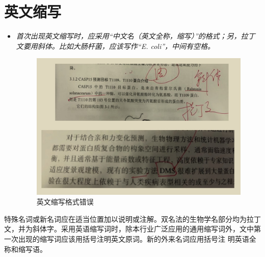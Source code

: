 \section{英文缩写}
\begin{itemize}
\item \emph{首次出现英文缩写时，应采用“中文名（英文全称，缩写）”的格式；另，拉丁文要用斜体。比如大肠杆菌，应该写作“\textit{E. coli}”，中间有空格。}
\begin{figure}[!htpb]
\centering
\includegraphics[scale=0.65]{doc/figures/chk03.jpg}
\caption{英文缩写格式错误}
\label{fig:abbrv-error}
\end{figure}
\end{itemize}

特殊名词或新名词应在适当位置加以说明或注解。双名法的生物学名部分均为拉丁文，并为斜体字。采用英语缩写词时，除本行业广泛应用的通用缩写词外，文中第一次出现的缩写词应该用括号注明英文原词。新的外来名词应用括号注
明英语全称和缩写语。



